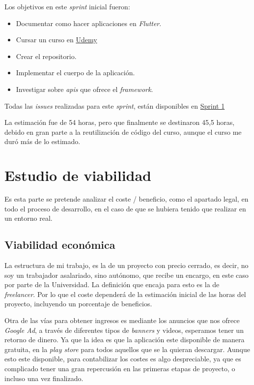 Los objetivos en este \emph{sprint} inicial fueron:

\begin{itemize}
\item Documentar como hacer aplicaciones en \emph{Flutter}.
\item Cursar un curso en \href{https://www.udemy.com/course/flutter-primeros-pasos/}{Udemy}
\item Crear el repositorio.
\item Implementar el cuerpo de la aplicación.
\item Investigar sobre \emph{apis} que ofrece el \emph{framework}.
\end{itemize}

Todas las \emph{issues} realizadas para este \emph{sprint}, están disponibles en \href{https://github.com/scc0034/flutter_serpiente/milestone/1?closed=1}{Sprint 1}

La estimación fue de 54 horas, pero que finalmente se destinaron 45,5 horas, debido en gran parte a la reutilización de código del curso, aunque el curso me duró más de lo estimado.



\section{Estudio de viabilidad}

Es esta parte se pretende analizar el coste / beneficio, como el apartado legal, en todo el proceso de desarrollo, en el caso de que se hubiera tenido que realizar en un entorno real. 


\subsection{Viabilidad económica}
La estructura de mi trabajo, es la de un proyecto con precio cerrado, es decir, no soy un trabajador asalariado, sino autónomo, que recibe un encargo, en este caso por parte de la Universidad. La definición que encaja para esto es la de \emph{freelancer}. Por lo que el coste dependerá de la estimación inicial de las horas del proyecto, incluyendo un porcentaje de beneficios.

Otra de las vías para obtener ingresos es mediante los anuncios que nos ofrece \emph{Google Ad}, a través de diferentes tipos de \emph{banners} y videos, esperamos tener un retorno de dinero. Ya que la idea es que la aplicación este disponible de manera gratuita, en la \emph{play store} para todos aquellos que se la quieran descargar. Aunque esto este disponible, para contabilizar los costes es algo despreciable, ya que es complicado tener una gran repercusión en las primeras etapas de proyecto, o incluso una vez finalizado. 	

